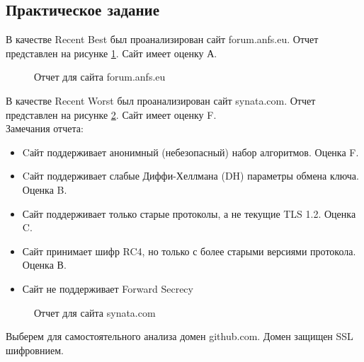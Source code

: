 \documentclass[10pt,a4paper]{report}
\begin{document}
\subsection{Практическое задание}
В качестве Recent Best был проанализирован сайт forum.anfs.eu. Отчет представлен на рисунке \ref{ris:img1}. Сайт имеет оценку А. \\
\begin{figure}[ht]	
\caption{Отчет для сайта forum.anfs.eu}
\label{ris:img1}
\end{figure}
В качестве Recent Worst был проанализирован сайт synata.com. Отчет представлен на рисунке \ref{ris:img2}. Сайт имеет оценку F.\\ Замечания отчета:
\begin{itemize}
\item Cайт поддерживает анонимный (небезопасный) набор алгоритмов. Оценка F.
\item Cайт поддерживает слабые Диффи-Хеллмана (DH) параметры обмена ключа. Оценка  B. 
\item Сайт поддерживает только старые протоколы, а не текущие TLS 1.2. Оценка C. 
\item Сайт принимает шифр RC4, но только с более старыми версиями протокола. Оценка В.
\item Сайт не поддерживает Forward Secrecy 
\end{itemize}
\begin{figure}[ht]	
\caption{Отчет для сайта synata.com}
\label{ris:img2}
\end{figure}
Выберем для самостоятельного анализа домен github.com. Домен защищен SSL шифровнием. 
\end{document}
